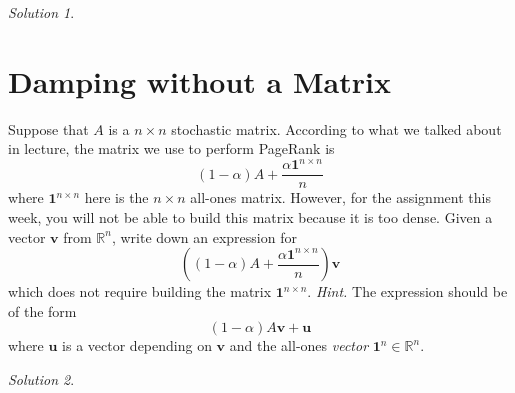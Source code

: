 \documentclass{article}
\newcommand{\vv}[1]{\mathbf{#1}}
\newcommand{\R}{\mathbb R}
\theoremstyle{remark}
\newtheorem*{solution}{Solution}
\begin{document}
\medskip
\begin{solution}
\end{solution}

\pagebreak
\section{Damping without a Matrix}

Suppose that $A$ is a $n \times n$ stochastic matrix.
According to what we talked about in lecture, the matrix we use to perform PageRank is
\begin{displaymath}
  (1 - \alpha)A + \frac{\alpha \vv 1^{n \times n}}{n}
\end{displaymath}
where $\vv 1^{n \times n}$ here is the $n \times n$ all-ones matrix.
However, for the assignment this week, you will not be able to build this matrix because it is too dense.
Given a vector $\vv v$ from $\R^n$, write down an expression for
\begin{displaymath}
  \left((1 - \alpha)A + \frac{\alpha \vv 1^{n \times n}}{n}\right)\vv v
\end{displaymath}
which does not require building the matrix $\vv 1^{n \times n}$.
\textit{Hint.} The expression should be of the form
\begin{displaymath}
  (1 - \alpha)A\vv v + \vv u
\end{displaymath}
where $\vv u$ is a vector depending on $\vv v$ and the all-ones \textit{vector} $\vv 1^n \in \R^n$.

\begin{solution}
\end{solution}
\end{document}
